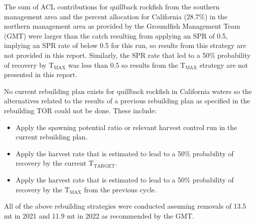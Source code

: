 \documentclass[11pt,
  english,
  letterpaper,
]{article}
\begin{document}

The sum of ACL contributions for quillback rockfish from the southern management area and the percent allocation for California (28.7{\(\%\)\leavevmode\tagmcend\tagstructend}) in the northern management area as provided by the Groundfish Management Team (GMT) were larger than the catch resulting from applying an SPR of 0.5, implying an SPR rate of below 0.5 for this run, so results from this strategy are not provided in this report. Similarly, the SPR rate that led to a 50{\(\%\)\leavevmode\tagmcend\tagstructend} probability of recovery by {\(\text{T}_\text{MAX}\)\leavevmode\tagmcend\tagstructend} was less than 0.5 so results from the {\(\text{T}_\text{MAX}\)\leavevmode\tagmcend\tagstructend} strategy are not presented in this report.

\leavevmode\tagmcend\tagstructend\par


No current rebuilding plan exists for quillback rockfish in California waters so the alternatives related to the results of a previous rebuilding plan as specified in the rebuilding TOR could not be done. These include:

\leavevmode\tagmcend\tagstructend\par

\begin{itemize}
 \item Apply the spawning potential ratio or relevant harvest control run in the current rebuilding plan. 
 \item Apply the harvest rate that is estimated to lead to a 50$\%$ probability of recovery by the current $\text{T}_\text{TARGET}$.
 \item Apply the harvest rate that is estimated to lead to a 50$\%$ probability of recovery by the $\text{T}_\text{MAX}$ from the previous cycle.
\end{itemize}


All of the above rebuilding strategies were conducted assuming removals of 13.5 mt in 2021 and 11.9 mt in 2022 as recommended by the GMT.

\leavevmode\tagmcend\tagstructend\par
\end{document}
